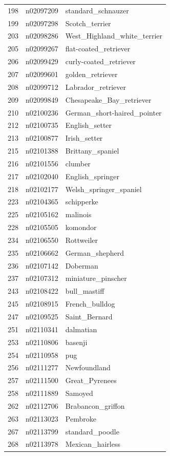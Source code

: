 \begin{table}
\begin{tabular}{cll}
198 & n02097209 & standard_schnauzer \\
199 & n02097298 & Scotch_terrier \\
203 & n02098286 & West_Highland_white_terrier \\
205 & n02099267 & flat-coated_retriever \\
206 & n02099429 & curly-coated_retriever \\
207 & n02099601 & golden_retriever \\
208 & n02099712 & Labrador_retriever \\
209 & n02099849 & Chesapeake_Bay_retriever \\
210 & n02100236 & German_short-haired_pointer \\
212 & n02100735 & English_setter \\
213 & n02100877 & Irish_setter \\
215 & n02101388 & Brittany_spaniel \\
216 & n02101556 & clumber \\
217 & n02102040 & English_springer \\
218 & n02102177 & Welsh_springer_spaniel \\
223 & n02104365 & schipperke \\
225 & n02105162 & malinois \\
228 & n02105505 & komondor \\
234 & n02106550 & Rottweiler \\
235 & n02106662 & German_shepherd \\
236 & n02107142 & Doberman \\
237 & n02107312 & miniature_pinscher \\
243 & n02108422 & bull_mastiff \\
245 & n02108915 & French_bulldog \\
247 & n02109525 & Saint_Bernard \\
251 & n02110341 & dalmatian \\
253 & n02110806 & basenji \\
254 & n02110958 & pug \\
256 & n02111277 & Newfoundland \\
257 & n02111500 & Great_Pyrenees \\
258 & n02111889 & Samoyed \\
262 & n02112706 & Brabancon_griffon \\
263 & n02113023 & Pembroke \\
267 & n02113799 & standard_poodle \\
268 & n02113978 & Mexican_hairless \\

\end{tabular}
\end{table}
